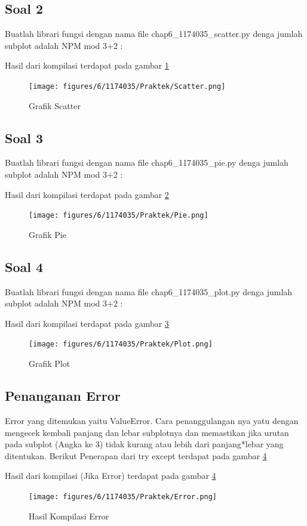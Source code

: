 	\subsection{Soal 2}

	Buatlah librari fungsi dengan nama file chap6\_1174035\_scatter.py denga jumlah subplot adalah NPM mod 3+2 : 

	
	
	Hasil dari kompilasi terdapat pada gambar \ref{1174035_Scatter}
	\begin{figure}[ht]
		\centerline{\texttt{[image: figures/6/1174035/Praktek/Scatter.png]}}
		\caption{Grafik Scatter}
		\label{1174035_Scatter}
	\end{figure}
	
	\subsection{Soal 3}

	Buatlah librari fungsi dengan nama file chap6\_1174035\_pie.py denga jumlah subplot adalah NPM mod 3+2 : 

	
	
	Hasil dari kompilasi terdapat pada gambar \ref{1174035_Pie}
	\begin{figure}[ht]
		\centerline{\texttt{[image: figures/6/1174035/Praktek/Pie.png]}}
		\caption{Grafik Pie}
		\label{1174035_Pie}
	\end{figure}
	\subsection{Soal 4}

	Buatlah librari fungsi dengan nama file chap6\_1174035\_plot.py denga jumlah subplot adalah NPM mod 3+2 : 

	
	
	Hasil dari kompilasi terdapat pada gambar \ref{1174035_Plot}
	\begin{figure}[ht]
		\centerline{\texttt{[image: figures/6/1174035/Praktek/Plot.png]}}
		\caption{Grafik Plot}
		\label{1174035_Plot}
	\end{figure}
	\subsection{Penanganan Error}
	Error yang ditemukan yaitu ValueError. Cara penanggulangan nya yatu dengan mengecek kembali panjang dan lebar subplotnya dan memastikan jika urutan pada subplot (Angka ke 3) tidak kurang atau lebih dari panjang*lebar yang ditentukan.
	Berikut Penerapan dari try except terdapat pada gambar \ref{1174035_Error}
	
	Hasil dari kompilasi (Jika Error) terdapat pada gambar \ref{1174035_Error} 
	\begin{figure}[ht]
		\centerline{\texttt{[image: figures/6/1174035/Praktek/Error.png]}}
		\caption{Hasil Kompilasi Error}
		\label{1174035_Error}
	\end{figure}
	
